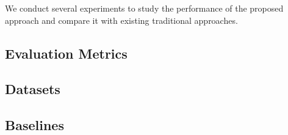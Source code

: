 We conduct several experiments to study the performance of the proposed approach and compare it with existing traditional approaches.

\subsection{Evaluation Metrics}
\label{sec:metrics}


\subsection{Datasets}
\label{sec:dataset}


\subsection{Baselines}
\label{sec:baselines}


